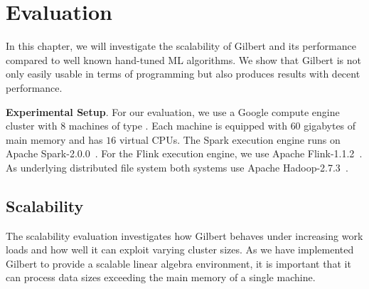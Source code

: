 \section{Evaluation}
\label{sec:evaluation}

In this chapter, we will investigate the scalability of Gilbert and its performance compared to well known hand-tuned ML algorithms.
We show that Gilbert is not only easily usable in terms of programming but also produces results with decent performance.

\textbf{Experimental Setup}. For our evaluation, we use a Google compute engine cluster with $8$ machines of type .
Each machine is equipped with $60$ gigabytes of main memory and has $16$ virtual CPUs. 
The Spark execution engine runs on Apache Spark-2.0.0~\cite{spark}.
For the Flink execution engine, we use Apache Flink-1.1.2~\cite{flink}. 
As underlying distributed file system both systems use Apache Hadoop-2.7.3~\cite{hadoop:2008a}.

\subsection{Scalability}

The scalability evaluation investigates how Gilbert behaves under increasing work loads and how well it can exploit varying cluster sizes.
As we have implemented Gilbert to provide a scalable linear algebra environment, it is important that it can process data sizes exceeding the main memory of a single machine.



